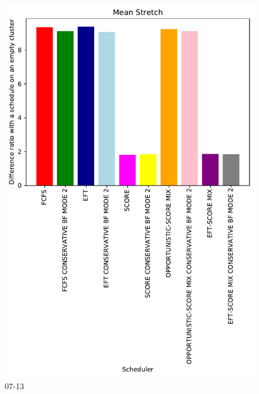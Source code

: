 \documentclass[a4paper]{article}
\begin{document}
\begin{figure}\includegraphics[width=0.9\linewidth]{MBSS/plot/Results_FCFS_Score_Backfill_2022-07-13->2022-07-13_V10000_Mean_Stretch_450_128_32_256_4_1024.pdf}\caption{07-13}\end{figure}
\end{document}
